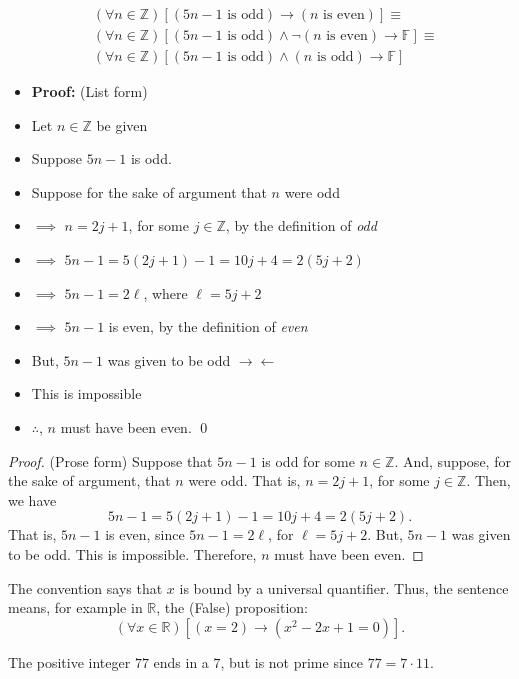 \begin{Solution}{7.4}
\begin{align*}
&(\forall n\in\mathbb{Z})[ (5n-1 \text{ is odd}) \rightarrow (n \text{ is even}) ]\equiv \\
&(\forall n\in\mathbb{Z})[ (5n-1 \text{ is odd}) \land  \lnot(n \text{ is even}) \rightarrow \mathbb{F}]\equiv \\
&(\forall n\in\mathbb{Z})[ (5n-1 \text{ is odd}) \land (n \text{ is odd}) \rightarrow \mathbb{F} ]
\end{align*}
\begin{itemize}[noitemsep, label=$\blacktriangleright$]
    \item \textbf{Proof:} (List form)
    \item Let $n\in\mathbb{Z}$ be given
    \item Suppose  $5n-1$ is odd.
    \item Suppose for the sake of argument that $n$ were odd
    \item $\implies$ $n=2j+1$, for some $j\in\mathbb{Z}$, by the definition of \textit{odd}
    \item $\implies$  $5n-1=5(2j+1)-1=10j+4=2(5j+2)$
    \item $\implies$  $5n-1=2\ell$, where $\ell=5j+2$
    \item $\implies$ $5n-1$ is even, by the definition of \textit{even}
    \item But, $5n-1$ was given to be odd $\rightarrow\leftarrow$
    \item This is impossible
    \item $\therefore$, $n$ must have been even. \qed
\end{itemize}
\begin{proof}(Prose form)
Suppose that $5n-1$ is odd for some $n\in\mathbb{Z}$. And, suppose, for the sake of argument, that
$n$ were odd. That is, $n=2j+1$, for some $j\in\mathbb{Z}$. Then, we have
\[
 5n-1 = 5(2j+1)-1 =10j+4=2(5j+2).
\]
That is, $5n-1$ is even, since $5n-1=2\ell$, for $\ell=5j+2$. But, $5n-1$ was given to be odd.
This is impossible. Therefore, $n$ must have been even.
\end{proof}
\end{Solution}

\begin{Solution}{7.5}
The convention says that $x$ is bound by a universal quantifier. Thus, the sentence means, for example in $\mathbb{R}$, the
(False) proposition:
\[
(\forall x\in\mathbb{R})[ (x=2) \rightarrow (x^2-2x+1=0)  ].
\]
\end{Solution}
\begin{Solution}{7.6}
The positive integer $77$ ends in a $7$, but is not prime since $77 = 7\cdot 11$.
\end{Solution}
